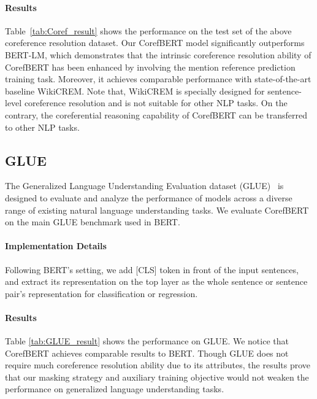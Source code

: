 \documentclass[11pt,a4paper]{article}
\newcommand\CorefBERT{CorefBERT\xspace}
\begin{document}
\vspace{-0.1em}
\paragraph{Results}
Table~\ref{tab:Coref_result} shows the performance on the test set of the above coreference resolution dataset. Our CorefBERT model significantly outperforms BERT-LM, which demonstrates that the intrinsic coreference resolution ability of  CorefBERT has been enhanced by involving the mention reference prediction training task. Moreover, it achieves comparable performance with state-of-the-art baseline WikiCREM. Note that, WikiCREM is specially designed for sentence-level coreference resolution and is not suitable for other NLP tasks. On the contrary, the coreferential reasoning capability of CorefBERT can be transferred to other NLP tasks. 



\subsection{GLUE}

The Generalized Language Understanding Evaluation  dataset (GLUE)~\citep{GLUE} is designed to evaluate and analyze the performance of models across a diverse range of existing natural language understanding tasks. We evaluate \CorefBERT on the main GLUE benchmark used in BERT.

\vspace{-0.1em}
\paragraph{Implementation Details}
Following BERT's setting, we add \textup{[CLS]} token in front of the input sentences, and extract its representation on the top layer as the whole sentence or sentence pair's representation for classification or regression. 

\vspace{-0.1em}
\paragraph{Results}
Table \ref{tab:GLUE_result} shows the performance on GLUE. We notice that CorefBERT achieves comparable results to BERT. Though GLUE does not require much coreference resolution ability due to its attributes, the results prove that our masking strategy and auxiliary training objective would not weaken the performance on generalized language understanding tasks.
\end{document}
